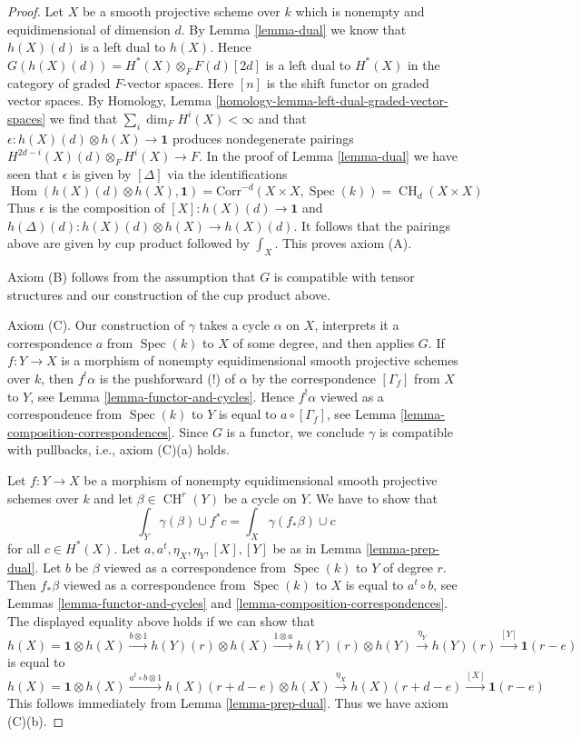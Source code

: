 \documentclass[10pt,a4paper]{amsart}
\theoremstyle{plain}
\theoremstyle{definition}
\theoremstyle{remark}
\numberwithin{equation}{subsection}
\def\Spec{\mathop{\mathrm{Spec}}}
\def\Hom{\mathop{\mathrm{Hom}}\nolimits}
\def\CH{\mathop{\mathrm{CH}}\nolimits}
\begin{document}
\begin{proof}
\medskip\noindent
Let $X$ be a smooth projective scheme over $k$ which is
nonempty and equidimensional of dimension $d$. By Lemma \ref{lemma-dual}
we know that $h(X)(d)$ is a left dual to $h(X)$. Hence
$G(h(X)(d)) = H^*(X) \otimes_F F(d)[2d]$
is a left dual to $H^*(X)$ in the category of graded $F$-vector spaces.
Here $[n]$ is the shift functor on graded vector spaces.
By Homology, Lemma \ref{homology-lemma-left-dual-graded-vector-spaces}
we find that $\sum_i \dim_F H^i(X) < \infty$ and that
$\epsilon : h(X)(d) \otimes h(X) \to \mathbf{1}$ produces
nondegenerate pairings $H^{2d - i}(X)(d) \otimes_F H^i(X) \to F$.
In the proof of Lemma \ref{lemma-dual} we have seen that
$\epsilon$ is given by $[\Delta]$ via the identifications
$$
\Hom(h(X)(d) \otimes h(X), \mathbf{1}) =
\text{Corr}^{-d}(X \times X, \Spec(k)) =
\CH_d(X \times X)
$$
Thus $\epsilon$ is the composition of $[X] : h(X)(d) \to \mathbf{1}$
and $h(\Delta)(d) : h(X)(d) \otimes h(X) \to h(X)(d)$. It follows
that the pairings above are given by cup product followed by
$\int_X$. This proves axiom (A).

\medskip\noindent
Axiom (B) follows from the assumption that $G$ is compatible
with tensor structures and our construction of the cup product above.

\medskip\noindent
Axiom (C). Our construction of $\gamma$ takes a cycle $\alpha$ on $X$,
interprets it a correspondence $a$ from $\Spec(k)$ to $X$ of some degree,
and then applies $G$. If $f : Y \to X$ is a morphism of nonempty
equidimensional smooth projective schemes over $k$, then
$f^!\alpha$ is the pushforward (!) of $\alpha$
by the correspondence $[\Gamma_f]$ from $X$ to $Y$, see
Lemma \ref{lemma-functor-and-cycles}. Hence
$f^!\alpha$ viewed as a correspondence from $\Spec(k)$ to $Y$
is equal to $a \circ [\Gamma_f]$, see
Lemma \ref{lemma-composition-correspondences}.
Since $G$ is a functor, we conclude
$\gamma$ is compatible with pullbacks, i.e., axiom (C)(a) holds.

\medskip\noindent
Let $f : Y \to X$ be a morphism of nonempty equidimensional
smooth projective schemes over $k$ and
let $\beta \in \CH^r(Y)$ be a cycle on $Y$. We have to show that
$$
\int_Y \gamma(\beta) \cup f^*c = \int_X \gamma(f_*\beta) \cup c
$$
for all $c \in H^*(X)$. Let $a, a^t, \eta_X, \eta_Y, [X], [Y]$
be as in Lemma \ref{lemma-prep-dual}.
Let $b$ be $\beta$ viewed as a correspondence from $\Spec(k)$ to $Y$
of degree $r$. Then $f_*\beta$ viewed as a correspondence from
$\Spec(k)$ to $X$ is equal to $a^t \circ b$, see
Lemmas \ref{lemma-functor-and-cycles} and
\ref{lemma-composition-correspondences}.
The displayed equality above holds if we can show that
$$
h(X) = \mathbf{1} \otimes h(X)
\xrightarrow{b \otimes 1}
h(Y)(r) \otimes h(X)
\xrightarrow{1 \otimes a}
h(Y)(r) \otimes h(Y)
\xrightarrow{\eta_Y}
h(Y)(r)
\xrightarrow{[Y]}
\mathbf{1}(r - e)
$$
is equal to
$$
h(X) = \mathbf{1} \otimes h(X)
\xrightarrow{a^t \circ b \otimes 1}
h(X)(r + d - e) \otimes h(X)
\xrightarrow{\eta_X}
h(X)(r + d - e)
\xrightarrow{[X]}
\mathbf{1}(r - e)
$$
This follows immediately from Lemma \ref{lemma-prep-dual}.
Thus we have axiom (C)(b).


\end{proof}
\end{document}

